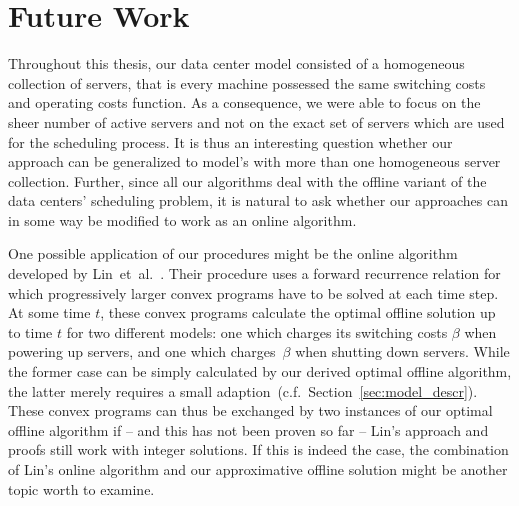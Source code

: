\section{Future Work}
Throughout this thesis, our data center model consisted of a homogeneous collection of servers, that is every machine possessed the same switching costs and operating costs function. As a consequence, we were able to focus on the sheer number of active servers and not on the exact set of servers which are used for the scheduling process. It is thus an interesting question whether our approach can be generalized to model's with more than one homogeneous server collection.
Further, since all our algorithms deal with the offline variant of the data centers' scheduling problem, it is natural to ask whether our approaches can in some way be modified to work as an online algorithm. 

One possible application of our procedures might be the online algorithm developed by Lin~et~al.~\parencite{dyn-right-sizing}. Their procedure uses a forward recurrence relation for which progressively larger convex programs have to be solved at each time step. At some time $t$, these convex programs calculate the optimal offline solution up to time $t$ for two different models: one which charges its switching costs $\beta$ when powering up servers, and one which charges~$\beta$ when shutting down servers. While the former case can be simply calculated by our derived optimal offline algorithm, the latter merely requires a small adaption~(c.f.\ Section~\ref{sec:model_descr}). These convex programs can thus be exchanged by two instances of our optimal offline algorithm if -- and this has not been proven so far -- Lin's approach and proofs still work with integer solutions. If this is indeed the case, the combination of Lin's online algorithm and our approximative offline solution might be another topic worth to examine.
